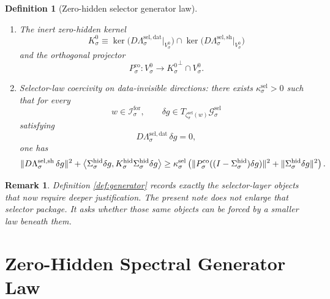 \documentclass[11pt]{article}
\newcommand{\ForSpace}[1]{\mathcal I_{#1}^{\mathrm{for}}}
\newcommand{\HiddenOperator}[1]{K_{#1}^{\mathrm{hid}}}
\newcommand{\GenSpace}[1]{\mathcal G_{#1}^{\mathrm{sel}}}
\newcommand{\GenData}[1]{\Lambda_{#1}^{\mathrm{sel,dat}}}
\newcommand{\GenShell}[1]{\Lambda_{#1}^{\mathrm{sel,sh}}}
\newcommand{\HiddenSel}[1]{\Sigma_{#1}^{\mathrm{hid}}}
\newcommand{\ZeroHiddenVec}[1]{V_{#1}^{0}}
\newcommand{\GenEmbed}[1]{\zeta_{#1}^{\mathrm{sel}}}
\newcommand{\Kernel}[1]{K_{#1}^{0}}
\newcommand{\StateComp}[1]{P_{#1}^{\mathrm{co}}}
\newtheorem{definition}{Definition}
\newtheorem{remark}{Remark}
\begin{document}
\begin{definition}[Zero-hidden selector generator law]
\begin{enumerate}
\begin{equation}
    \bigl(\GenShell{\sigma}\bigr)^{-1}(0)
    \Bigr).
    \label{eq:gensolvability}
    \end{equation}
    \item The inert zero-hidden kernel
    \[
    \Kernel{\sigma}
    \equiv
    \ker\bigl(D\GenData{\sigma}\big|_{\ZeroHiddenVec{\sigma}}\bigr)
    \cap
    \ker\bigl(D\GenShell{\sigma}\big|_{\ZeroHiddenVec{\sigma}}\bigr)
    \]
    and the orthogonal projector
    \[
    \StateComp{\sigma}:
    \ZeroHiddenVec{\sigma}\to
    {\Kernel{\sigma}}^{\perp}\cap\ZeroHiddenVec{\sigma}.
    \]
    \item Selector-law coercivity on data-invisible directions: there exists \(\kappa_{\sigma}^{\mathrm{sel}}>0\) such that for every
    \[
    w\in\ForSpace{\sigma},
    \qquad
    \delta g\in T_{\GenEmbed{\sigma}(w)}\GenSpace{\sigma}
    \]
    satisfying
    \[
    D\GenData{\sigma}\,\delta g=0,
    \]
    one has
    \begin{equation}
    \|D\GenShell{\sigma}\,\delta g\|^{2}
    +
    \ev{
    \HiddenSel{\sigma}\delta g,
    \HiddenOperator{\sigma}\HiddenSel{\sigma}\delta g
    }
    \ge
    \kappa_{\sigma}^{\mathrm{sel}}
    \left(
    \|\StateComp{\sigma}( (I-\HiddenSel{\sigma})\delta g )\|^{2}
    +
    \|\HiddenSel{\sigma}\delta g\|^{2}
    \right).
    \label{eq:gencoercive}
    \end{equation}
\end{enumerate}
\end{definition}

\begin{remark}
Definition \ref{def:generator} records exactly the selector-layer objects that now require deeper justification. The present note does not enlarge that selector package. It asks whether those same objects can be forced by a smaller law beneath them.
\end{remark}

\section{Zero-Hidden Spectral Generator Law}
\end{document}
